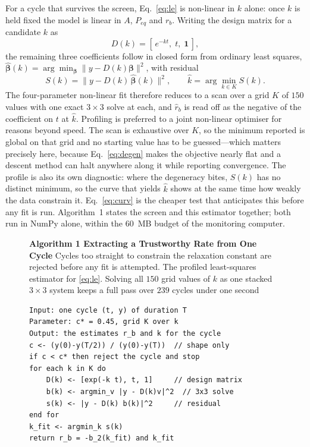 \documentclass[sigconf]{acmart}
\newcommand{\rb}{\ensuremath{r_{b}}}
\newcommand{\rbh}{\ensuremath{\hat{r}_{b}}}
\begin{document}
For a cycle that survives the screen, Eq.~\eqref{eq:le} is non-linear
in $k$ alone: once $k$ is held fixed the model is linear in $A$,
$P_{eq}$ and \rb{}. Writing the design matrix for a candidate $k$ as
\begin{equation}
D(k)=\left[\,e^{-kt},\; t,\; \mathbf{1}\,\right] ,
\label{eq:design}
\end{equation}
the remaining three coefficients follow in closed form from ordinary
least squares, $\hat{\boldsymbol\beta}(k)=\arg\min_{\boldsymbol\beta}
\lVert y-D(k)\boldsymbol\beta\rVert^{2}$, with residual
\begin{equation}
S(k)=\bigl\lVert y-D(k)\,\hat{\boldsymbol\beta}(k)\bigr\rVert^{2} ,
\qquad
\hat{k}=\arg\min_{k\in K} S(k) .
\label{eq:profile}
\end{equation}
The four-parameter non-linear fit therefore reduces to a scan over a
grid $K$ of $150$ values with one exact $3\times3$ solve at each,
and \rbh{} is read off as the negative of the coefficient on $t$ at
$\hat{k}$. Profiling is preferred to a joint non-linear optimiser for
reasons beyond speed. The scan is exhaustive over $K$, so the minimum
reported is global on that grid and no starting value has to be
guessed---which matters precisely here, because
Eq.~\eqref{eq:degen} makes the objective nearly flat and a descent
method can halt anywhere along it while reporting convergence. The
profile is also its own diagnostic: where the degeneracy bites, $S(k)$
has no distinct minimum, so the curve that yields $\hat{k}$ shows at
the same time how weakly the data constrain it.
Eq.~\eqref{eq:curv} is the cheaper test that anticipates this before
any fit is run. Algorithm~1 states the screen and this estimator together;
both run in NumPy alone, within the $60$~MB budget of the monitoring
computer.

\begin{figure}[t]
\noindent\textbf{Algorithm 1  Extracting a Trustworthy Rate from One Cycle} Cycles too straight to constrain the relaxation constant are rejected before any fit is attempted. The profiled
least-squares estimator for \eqref{eq:le}. Solving all $150$ grid
values of $k$ as one stacked $3\times3$ system keeps a full pass over
$239$ cycles under one second

\begin{verbatim}
Input: one cycle (t, y) of duration T
Parameter: c* = 0.45, grid K over k
Output: the estimates r_b and k for the cycle
c <- (y(0)-y(T/2)) / (y(0)-y(T))  // shape only
if c < c* then reject the cycle and stop
for each k in K do
    D(k) <- [exp(-k t), t, 1]     // design matrix
    b(k) <- argmin_v |y - D(k)v|^2  // 3x3 solve
    s(k) <- |y - D(k) b(k)|^2     // residual
end for
k_fit <- argmin_k s(k)
return r_b = -b_2(k_fit) and k_fit
\end{verbatim}

\end{figure}
\end{document}

